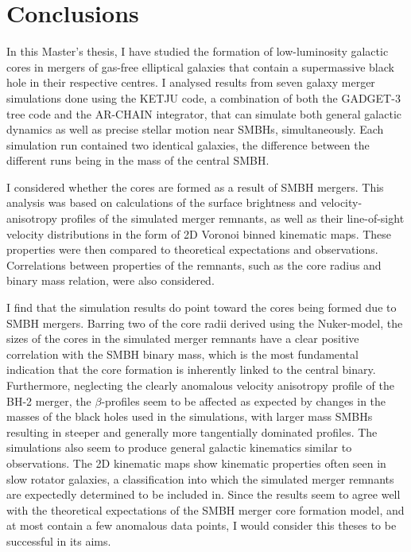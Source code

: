 \documentclass[english, twoside]{HYgradu}
\begin{document}
\begin{figure}
	\label{figure:profile_comparison}
\end{figure}


\chapter{Conclusions}

In this Master's thesis, I have studied the formation of low-luminosity galactic cores in mergers of gas-free elliptical galaxies that contain a supermassive black hole in their respective centres. I analysed results from seven galaxy merger simulations done using the KETJU code, a combination of both the GADGET-3 tree code and the AR-CHAIN integrator, that can simulate both general galactic dynamics as well as precise stellar motion near SMBHs, simultaneously. Each simulation run contained two identical galaxies, the difference between the different runs being in the mass of the central SMBH. 

I considered whether the cores are formed as a result of SMBH mergers. This analysis was based on calculations of the surface brightness and velocity-anisotropy profiles of the simulated merger remnants, as well as their line-of-sight velocity distributions in the form of 2D Voronoi binned kinematic maps. These properties were then compared to theoretical expectations and observations. Correlations between properties of the remnants, such as the core radius and binary mass relation, were also considered.

I find that the simulation results do point toward the cores being formed due to SMBH mergers. Barring two of the core radii derived using the Nuker-model, the sizes of the cores in the simulated merger remnants have a clear positive correlation with the SMBH binary mass, which is the most fundamental indication that the core formation is inherently linked to the central binary. Furthermore, neglecting the clearly anomalous velocity anisotropy profile of the BH-2 merger, the $\beta$-profiles seem to be affected as expected by changes in the masses of the black holes used in the simulations, with larger mass SMBHs resulting in steeper and generally more tangentially dominated profiles. The simulations also seem to produce general galactic kinematics similar to observations. The 2D kinematic maps show kinematic properties often seen in slow rotator galaxies, a classification into which the simulated merger remnants are expectedly determined to be included in. Since the results seem to agree well with the theoretical expectations of the SMBH merger core formation model, and at most contain a few anomalous data points, I would consider this theses to be successful in its aims.
\end{document}
